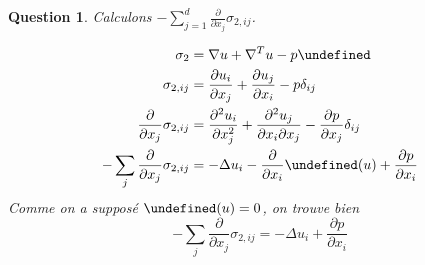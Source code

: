 \documentclass{article}
\theoremstyle{plain}
\newtheorem{ques}{Question}
\let\div\undefined
\DeclareMathOperator{\div}{div}
\let\Id\undefined
\DeclareMathOperator{\Id}{Id}
\begin{document}
\begin{ques}
Calculons $-\sum_{j=1}^d \frac{\partial}{\partial x_j}\sigma_{2, ij}$.

\begin{align*}
    \sigma_2 &= \nabla u + \nabla^T u - p \Id \\
    \sigma_{2, ij} &= \frac{\partial u_i}{\partial x_j} +\frac{\partial u_j}{\partial x_i} - p \delta_{ij} \\
    \frac{\partial}{\partial x_j}\sigma_{2, ij} &= \frac{\partial^2 u_i}{\partial x_j^2} + \frac{\partial^2 u_j}{\partial x_i \partial x_j} - \frac{\partial p}{\partial x_j} \delta_{ij} \\
    -\sum_{j} \frac{\partial}{\partial x_j}\sigma_{2, ij} &= -\Delta u_i - \frac{\partial}{\partial x_i} \div(u) + \frac{\partial p}{\partial x_i} \\
\end{align*}
Comme on a supposé $\div(u)=0$, on trouve bien
\[
    -\sum_{j} \frac{\partial}{\partial x_j}\sigma_{2, ij} = -\Delta u_i + \frac{\partial p}{\partial x_i}
\]
\end{ques}
\end{document}
